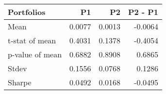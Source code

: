 \begin{tabular}{lrrr}
\toprule
Portfolios & P1 & P2 & P2 - P1 \\
\midrule
Mean & 0.0077 & 0.0013 & -0.0064 \\
t-stat of mean & 0.4031 & 0.1378 & -0.4054 \\
p-value of mean & 0.6882 & 0.8908 & 0.6865 \\
Stdev & 0.1556 & 0.0768 & 0.1286 \\
Sharpe & 0.0492 & 0.0168 & -0.0495 \\
\bottomrule
\end{tabular}
